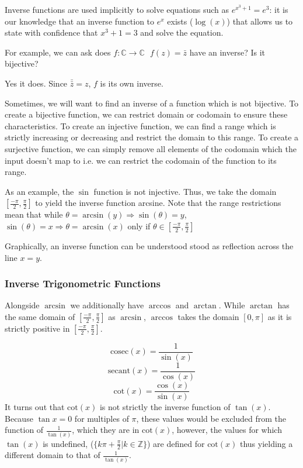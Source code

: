 \documentclass[12pt]{report}
\newcommand{\Z}{\mathbb{Z}}
\newcommand{\C}{\mathbb{C}}
\begin{document}
\begin{flushleft}
\bigskip
Inverse functions are used implicitly to solve equations such as 
\(e^{x^3 + 1} = e^3\): it is our knowledge that an inverse function to \(e^x\)
exists (\(\log(x)\)) that allows us to state with confidence that 
\(x^3 + 1 = 3\) and solve the equation.

For example, we can ask does \(f: \C \rightarrow \C\:\:\:f(z) = \bar{z}\) 
have an inverse? Is it bijective?

\bigskip
Yes it does. Since \(\bar{\bar{z}} = z\), \(f\) is its own inverse.

\bigskip
Sometimes, we will want to find an inverse of a function which is not 
bijective. To create a bijective function, we can restrict domain or codomain 
to ensure these characteristics. To create an injective function, we can find a
range which is strictly increasing or decreasing and restrict the domain to 
this range. To create a surjective function, we can simply remove all elements 
of the codomain which the input doesn't map to i.e. we can restrict the 
codomain of the function to its range.

\bigskip
As an example, the \(\sin\) function is not injective. Thus, we take the domain
\([\frac{-\pi}{2}, \frac{\pi}{2}]\) to yield the inverse function arcsine. Note
that the range restrictions mean that while \(\theta = \arcsin(y) \Rightarrow 
\sin(\theta) = y\), \(\sin(\theta) = x \Rightarrow \theta = \arcsin(x)\) only 
if \(\theta \in [\frac{-\pi}{2}, \frac{\pi}{2}]\)

\bigskip
Graphically, an inverse function can be understood stood as reflection across the 
line \(x = y\).

\subsubsection*{Inverse Trigonometric Functions}
Alongside \(\arcsin\) we additionally have \(\arccos\) and \(\arctan\).
While \(\arctan\) has the same domain of \([\frac{-\pi}{2}, \frac{\pi}{2}]\) as
\(\arcsin\), \(\arccos\) takes the domain \([0, \pi]\) as it is strictly 
positive in \([\frac{-\pi}{2}, \frac{\pi}{2}]\).

\[\mathrm{cosec}(x) = \frac{1}{\sin(x)}\]
\[\mathrm{secant}(x) = \frac{1}{\cos(x)}\]
\[\mathrm{cot}(x) = \frac{\cos(x)}{\sin(x)}\]
It turns out that \(\mathrm{cot}(x)\) is not strictly the inverse function of 
\(\tan(x)\). Because \(\tan{x} = 0\) for multiples of \(\pi\), these values 
would be excluded from the function of \(\frac{1}{\tan(x)}\), which they are 
in \(\mathrm{cot}(x)\), however, the values for which \(\tan(x)\) is undefined,
(\(\{k\pi + \frac{\pi}{2} | k \in \Z\}\)) are defined for \(\mathrm{cot}(x)\) 
thus yielding a different domain to that of \(\frac{1}{\tan(x)}\).


\end{flushleft}
\end{document}
